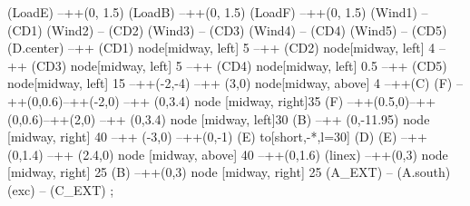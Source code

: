 \documentclass[tikz,border=3mm]{standalone}
\begin{document}
\begin{circuitikz}[
    node distance=1.5cm,
]
\draw[line width=1pt] 
(LoadE) --++(0, 1.5)
(LoadB) --++(0, 1.5)
(LoadF) --++(0, 1.5)
(Wind1) -- (CD1)
(Wind2) -- (CD2)
(Wind3) -- (CD3)
(Wind4) -- (CD4)
(Wind5) -- (CD5)
(D.center) --++ (CD1) node[midway, left] {5 }
--++ (CD2) node[midway, left] {4 }
--++ (CD3) node[midway, left] {5 }
--++ (CD4) node[midway, left] {0.5}
--++ (CD5) node[midway, left] {15}
--++(-2,-4)
--++ (3,0) node[midway, above] {4}
--++(C)
(F) --++(0,0.6)--++(-2,0) --++ (0,3.4) node [midway, right]{35}
(F) --++(0.5,0)--++(0,0.6)--++(2,0) --++ (0,3.4) node [midway, left]{30}
(B) --++ (0,-11.95) node [midway, right] {40}
--++ (-3,0) --++(0,-1)
(E) to[short,-*,l=30] (D)
(E) --++ (0,1.4) 
--++ (2.4,0) node [midway, above] {40}
--++(0,1.6)
(linex) --++(0,3) node [midway, right] {25}
(B) --++(0,3) node [midway, right] {25}
(A_EXT) -- (A.south)
(exc) -- (C_EXT)
;
\end{circuitikz}
\end{document}
